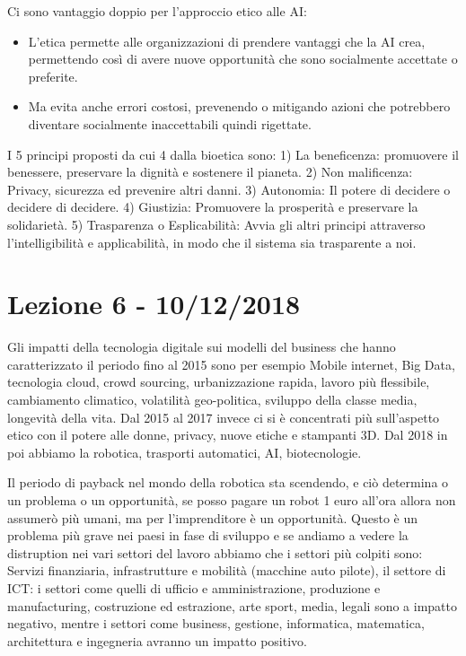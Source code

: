 \documentclass[a4page, 11pt]{article}
\begin{document}
Ci sono vantaggio doppio per l'approccio etico alle AI:

\begin{itemize}
	 
	\item
	L'etica permette alle organizzazioni di prendere vantaggi che la AI
	crea, permettendo così di avere nuove opportunità che sono socialmente
	accettate o preferite.
	\item
	Ma evita anche errori costosi, prevenendo o mitigando azioni che
	potrebbero diventare socialmente inaccettabili quindi rigettate.
\end{itemize}

I 5 principi proposti da cui 4 dalla bioetica sono: 1) La beneficenza:
promuovere il benessere, preservare la dignità e sostenere il pianeta.
2) Non malificenza: Privacy, sicurezza ed prevenire altri danni. 3)
Autonomia: Il potere di decidere o decidere di decidere. 4) Giustizia:
Promuovere la prosperità e preservare la solidarietà. 5) Trasparenza o
Esplicabilità: Avvia gli altri principi attraverso l'intelligibilità e
applicabilità, in modo che il sistema sia trasparente a noi.
\section*{Lezione 6 - 10/12/2018}

Gli impatti della tecnologia digitale sui modelli del business che hanno
caratterizzato il periodo fino al 2015 sono per esempio Mobile internet,
Big Data, tecnologia cloud, crowd sourcing, urbanizzazione rapida,
lavoro più flessibile, cambiamento climatico, volatilità geo-politica,
sviluppo della classe media, longevità della vita. Dal 2015 al 2017
invece ci si è concentrati più sull'aspetto etico con il potere alle
donne, privacy, nuove etiche e stampanti 3D. Dal 2018 in poi abbiamo la
robotica, trasporti automatici, AI, biotecnologie.

Il periodo di payback nel mondo della robotica sta scendendo, e ciò
determina o un problema o un opportunità, se posso pagare un robot 1
euro all'ora allora non assumerò più umani, ma per l'imprenditore è un
opportunità. Questo è un problema più grave nei paesi in fase di
sviluppo e se andiamo a vedere la distruption nei vari settori del
lavoro abbiamo che i settori più colpiti sono: Servizi finanziaria,
infrastrutture e mobilità (macchine auto pilote), il settore di ICT: i
settori come quelli di ufficio e amministrazione, produzione e
manufacturing, costruzione ed estrazione, arte sport, media, legali sono
a impatto negativo, mentre i settori come business, gestione,
informatica, matematica, architettura e ingegneria avranno un impatto
positivo.
\end{document}

